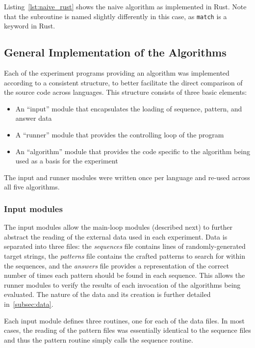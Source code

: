 Listing~\ref{lst:naive_rust} shows the naive algorithm as implemented in Rust. Note that the subroutine is named slightly differently in this case, as \texttt{match} is a keyword in Rust.



\subsection{General Implementation of the Algorithms}

Each of the experiment programs providing an algorithm was implemented according to a consistent structure, to better facilitate the direct comparison of the source code across languages. This structure consists of three basic elements:

\begin{itemize}
\item An ``input'' module that encapsulates the loading of sequence, pattern, and answer data
\item A ``runner'' module that provides the controlling loop of the program
\item An ``algorithm'' module that provides the code specific to the algorithm being used as a basis for the experiment
\end{itemize}

The input and runner modules were written once per language and re-used across all five algorithms.

\subsubsection{Input modules}

The input modules allow the main-loop modules (described next) to further abstract the reading of the external data used in each experiment. Data is separated into three files: the \textit{sequences} file contains lines of randomly-generated target strings, the \textit{patterns} file contains the crafted patterns to search for within the sequences, and the \textit{answers} file provides a representation of the correct number of times each pattern should be found in each sequence. This allows the runner modules to verify the results of each invocation of the algorithms being evaluated. The nature of the data and its creation is further detailed in~\ref{subsec:data}.

Each input module defines three routines, one for each of the data files. In most cases, the reading of the pattern files was essentially identical to the sequence files and thus the pattern routine simply calls the sequence routine.

